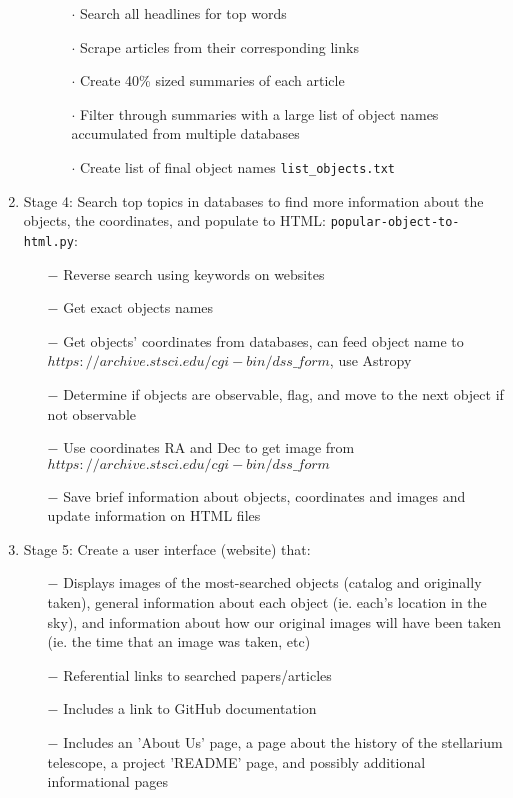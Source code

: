 \documentclass[12pt,letterpaper]{article}
\begin{document}
\begin{enumerate}[leftmargin=*]
\begin{enumerate}
            \begin{enumerate}[leftmargin=*]
                \item[$\cdot$] Search all headlines for top words
                \item[$\cdot$] Scrape articles from their corresponding links
                \item[$\cdot$] Create 40\% sized summaries of each article 
                \item[$\cdot$] Filter through summaries with a large 
                  list of object names accumulated from multiple databases
                 \item[$\cdot$] Create list of final object names \texttt{list\_objects.txt}
            \end{enumerate}
        \end{enumerate}
    \item Stage 4: Search top topics in databases to find more information 
    about the objects, the coordinates, and populate to HTML: \texttt{popular-object-to-html.py}:
        \begin{enumerate}
            \item [$-$] Reverse search using keywords on websites
            \item [$-$] Get exact objects names
            \item [$-$] Get objects' coordinates from databases, can feed object 
              name to $https://archive.stsci.edu/cgi-bin/dss\_form$, use Astropy
            \item [$-$] Determine if objects are observable, flag, and move to the next object if not observable
            \item [$-$] Use coordinates RA and Dec to get image 
              from $https://archive.stsci.edu/cgi-bin/dss\_form$
            \item [$-$] Save brief information about objects, coordinates and images and update information on HTML files
        \end{enumerate}
    \item Stage 5: Create a user interface (website) that:
    \begin{enumerate}
        \item [$-$] Displays images of the most-searched objects (catalog and originally taken),
        general information about each object (ie. each's location in the sky), and information about
        how our original images will have been taken (ie. the time that an image was taken, etc)
        \item [$-$] Referential links to searched papers/articles
        \item [$-$] Includes a link to GitHub documentation
        \item [$-$] Includes an 'About Us' page, a page about the history of the stellarium telescope, 
          a project 'README' page, and possibly additional informational pages
    \end{enumerate}
\end{enumerate}
\end{document}
